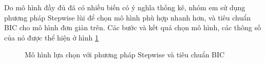 Do mô hình đầy đủ đã có nhiều biến có ý nghĩa thống kê, nhóm em sử dụng phương pháp Stepwise lùi để chọn mô hình phù hợp nhanh hơn, và tiêu chuẩn BIC cho mô hình đơn giản trên. Các bước và kết quả chọn mô hình, các thông số của nó được thể hiện ở hình \ref{fig-a1:model-bic} 
\begin{figure}[H]
	\centering
	\hfill
	\caption{Mô hình lựa chọn với phương pháp Stepwise và tiêu chuẩn BIC}
	\label{fig-a1:model-bic}
\end{figure}

